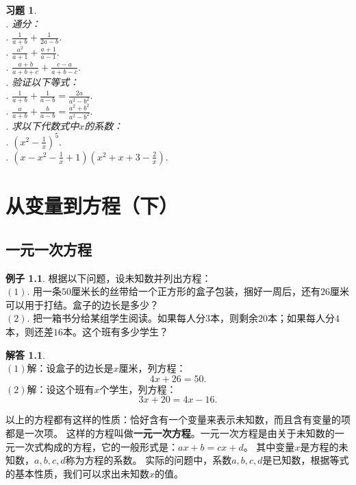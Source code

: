 \documentclass[12pt,UTF8]{ctexbook}
\theoremstyle{definition}
\newtheorem{ex}{例子}[section]
\newtheorem*{so}{解答}
\theoremstyle{plain}
\newtheorem{xt}{习题}[section]
\begin{document}
\begin{xt}\label{xt:5-1-0}
    \mbox{}\\
    . 通分：\\
    . $\frac{1}{a+b} + \frac{1}{2a-b}.$\\  %
    . $\frac{a^2}{a+1} + \frac{a+1}{a-1}.$\\  %
    . $\frac{a+b}{a+b+c} + \frac{c-a}{a+b-c}.$\\  %
    . 验证以下等式：\\
    . $\frac{1}{a+b} + \frac{1}{a-b} = \frac{2a}{a^2-b^2}.$\\
    . $\frac{a}{a+b} + \frac{b}{a-b} = \frac{a^2+b^2}{a^2-b^2}.$\\
    . 求以下代数式中$x$的系数：\\
    . $(x^2 - \frac{1}{x})^5.$\\  %
    . $(x - x^2 - \frac{1}{x} + 1)(x^2 + x + 3 - \frac{2}{x}).$ %
\end{xt}

\chapter{从变量到方程（下）}

\section{一元一次方程}

\begin{ex}\label{ex:4-0-0}
    根据以下问题，设未知数并列出方程：\\
    $(1).$ 用一条$50$厘米长的丝带给一个正方形的盒子包装，捆好一周后，还有$26$厘米可以用于打结。盒子的边长是多少？\\
    $(2).$ 把一箱书分给某组学生阅读。如果每人分$3$本，则剩余$20$本；如果每人分$4$本，则还差$16$本。这个班有多少学生？
\end{ex}
\begin{so}
    \mbox{} \\
    $(1)$解：设盒子的边长是$x$厘米，列方程：
    $$ 4x + 26 = 50.$$
    $(2)$解：设这个班有$x$个学生，列方程：
    $$ 3x + 20 = 4x - 16.$$
\end{so}
以上的方程都有这样的性质：恰好含有一个变量来表示未知数，而且含有变量的项都是一次项。
这样的方程叫做\textbf{一元一次方程}。一元一次方程是由关于未知数的一元一次式构成的方程，它的一般形式是：$ax+b=cx+d$。
其中变量$x$是方程的未知数，$a,b,c,d$称为方程的系数。
实际的问题中，系数$a,b,c,d$是已知数，根据等式的基本性质，我们可以求出未知数$x$的值。
\end{document}
